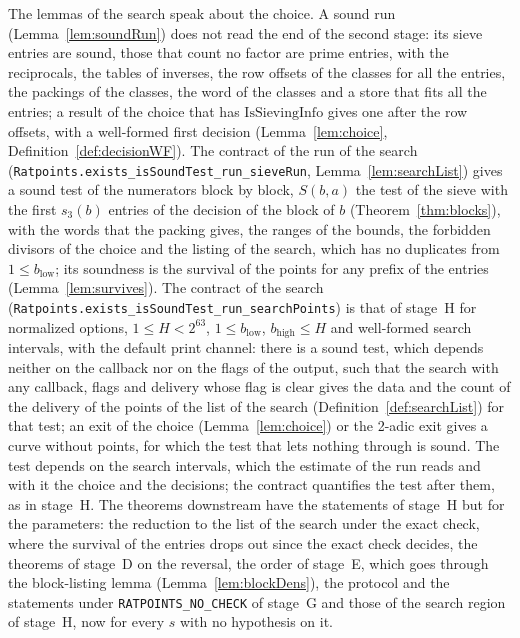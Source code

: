 The lemmas of the search speak about the choice. A sound run (Lemma~\ref{lem:soundRun}) does not
read the end of the second stage: its sieve entries are sound, those that count no factor are prime
entries, with the reciprocals, the tables of inverses, the row offsets of the classes for all the
entries, the packings of the classes, the word of the classes and a store that fits all the entries;
a result of the choice that has $\mathrm{IsSievingInfo}$ gives one after the row offsets, with a
well-formed first decision (Lemma~\ref{lem:choice}, Definition~\ref{def:decisionWF}). The contract
of the run of the search (\verb|Ratpoints.exists_isSoundTest_run_sieveRun|,
Lemma~\ref{lem:searchList}) gives a sound test of the numerators block by block, $S(b, a)$ the test
of the sieve with the first $s_3(b)$ entries of the decision of the block of $b$
(Theorem~\ref{thm:blocks}), with the words that the packing gives, the ranges of the bounds, the
forbidden divisors of the choice and the listing of the search, which has no duplicates from
$1 \le b_{\mathrm{low}}$; its soundness is the survival of the points for any prefix of the entries
(Lemma~\ref{lem:survives}). The contract of the search
(\verb|Ratpoints.exists_isSoundTest_run_searchPoints|) is that of stage~H for normalized options,
$1 \le H < 2^{63}$, $1 \le b_{\mathrm{low}}$, $b_{\mathrm{high}} \le H$ and well-formed search
intervals, with the default print channel: there is a sound test, which depends neither on the
callback nor on the flags of the output, such that the search with any callback, flags and delivery
whose flag is clear gives the data and the count of the delivery of the points of the list of the
search (Definition~\ref{def:searchList}) for that test; an exit of the choice
(Lemma~\ref{lem:choice}) or the 2-adic exit gives a curve without points, for which the test that
lets nothing through is sound. The test depends on the search intervals, which the estimate of the
run reads and with it the choice and the decisions; the contract quantifies the test after them, as
in stage~H. The theorems downstream have the statements of stage~H but for the parameters: the
reduction to the list of the search under the exact check, where the survival of the entries drops
out since the exact check decides, the theorems of stage~D on the reversal, the order of stage~E,
which goes through the block-listing lemma (Lemma~\ref{lem:blockDens}), the protocol and the
statements under \verb|RATPOINTS_NO_CHECK| of stage~G and those of the search region of stage~H, now
for every $s$ with no hypothesis on it.

